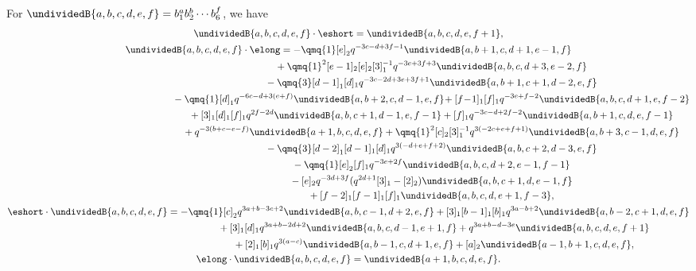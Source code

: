 \begin{lemma} \label{lemma:rho-rep-G}
For $\undividedB{a,b,c,d,e,f}=b_1^a b_2^b\cdots b_6^f$, we have
\begin{gather*}
\undividedB{a,b,c,d,e,f} \cdot \eshort=
\undividedB{a,b,c,d,e,f+1},\\
\undividedB{a,b,c,d,e,f} \cdot \elong=
 -\qmq{1} [e]_2 q^{-3 c-d+3 f-1} \undividedB{a,b+1,c,d+1,e-1,f} \\
 \hphantom{\undividedB{a,b,c,d,e,f} \cdot \elong=}{}
 +\qmq{1}^2 [e-1]_2 [e]_2 [3]_1^{-1}q^{-3 e+3 f+3} \undividedB{a,b,c,d+3,e-2,f}\\
 \hphantom{\undividedB{a,b,c,d,e,f} \cdot \elong=}{}
 -\qmq{3} [d-1]_1 [d]_1 q^{-3 c-2 d+3 e+3 f+1} \undividedB{a,b+1,c+1,d-2,e,f}\\
 \hphantom{\undividedB{a,b,c,d,e,f} \cdot \elong=}{}
 -\qmq{1} [d]_1 q^{-6 c-d+3 (e+f)} \undividedB{a,b+2,c,d-1,e,f} \!
  +[f\!-\!1]_1 [f]_1 q^{-3 e+f-2} \undividedB{a,b,c,d+1,e,f-2}\\
\hphantom{\undividedB{a,b,c,d,e,f} \cdot \elong=}{}
 +[3]_1 [d]_1 [f]_1 q^{2 f-2 d} \undividedB{a,b,c+1,d-1,e,f-1}
 +[f]_1 q^{-3 c-d+2 f-2} \undividedB{a,b+1,c,d,e,f-1}\\
\hphantom{\undividedB{a,b,c,d,e,f} \cdot \elong=}{}
 +q^{-3 (b+c-e-f)} \undividedB{a+1,b,c,d,e,f}
 +\qmq{1}^2 [c]_2 [3]_1^{-1}q^{3 (-2 c+e+f+1)} \undividedB{a,b+3,c-1,d,e,f}\\
\hphantom{\undividedB{a,b,c,d,e,f} \cdot \elong=}{}
 -\qmq{3} [d-2]_1 [d-1]_1 [d]_1 q^{3 (-d+e+f+2)} \undividedB{a,b,c+2,d-3,e,f} \\
\hphantom{\undividedB{a,b,c,d,e,f} \cdot \elong=}{}
 -\qmq{1} [e]_2 [f]_1 q^{-3 e+2 f} \undividedB{a,b,c,d+2,e-1,f-1}\\
\hphantom{\undividedB{a,b,c,d,e,f} \cdot \elong=}{}
 -[e]_2 q^{-3 d+3 f} (q^{2d+1} [3]_1-[2]_2) \undividedB{a,b,c+1,d,e-1,f} \\
\hphantom{\undividedB{a,b,c,d,e,f} \cdot \elong=}{}
 +[f-2]_1 [f-1]_1 [f]_1 \undividedB{a,b,c,d,e+1,f-3},\\
\eshort \cdot \undividedB{a,b,c,d,e,f}=
 -\qmq{1} [c]_2 q^{3 a+b-3 c+2} \undividedB{a,b,c-1,d+2,e,f}
 +[3]_1 [b-1]_1 [b]_1 q^{3 a-b+2} \undividedB{a,b-2,c+1,d,e,f}\\
\hphantom{\eshort \cdot \undividedB{a,b,c,d,e,f}=}{}
 +[3]_1 [d]_1 q^{3 a+b-2 d+2} \undividedB{a,b,c,d-1,e+1,f}
 +q^{3 a+b-d-3 e} \undividedB{a,b,c,d,e,f+1}\\
\hphantom{\eshort \cdot \undividedB{a,b,c,d,e,f}=}{}
 +[2]_1 [b]_1 q^{3 (a-c)} \undividedB{a,b-1,c,d+1,e,f}
 +[a]_2 \undividedB{a-1,b+1,c,d,e,f},\\
 \elong \cdot \undividedB{a,b,c,d,e,f}=
\undividedB{a+1,b,c,d,e,f}.
\end{gather*}
\end{lemma}
